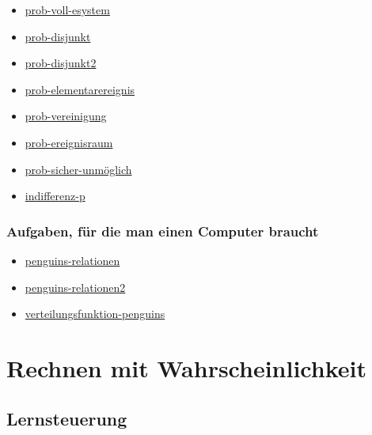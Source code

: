 \documentclass[
  ngerman,
  letterpaper,
  twoside,
  open=any]{scrbook}
\providecommand{\tightlist}{%
  \setlength{\itemsep}{0pt}\setlength{\parskip}{0pt}}\usepackage{longtable,booktabs,array}
\theoremstyle{definition}
\theoremstyle{plain}
\theoremstyle{definition}
\theoremstyle{definition}
\theoremstyle{remark}
\begin{document}
\begin{itemize}
\tightlist
\item
  \href{https://sebastiansauer.github.io/datenwerk/posts/prob-voll-esystem/}{prob-voll-esystem}
\item
  \href{https://sebastiansauer.github.io/datenwerk/posts/prob-disjunkt/}{prob-disjunkt}
\item
  \href{https://sebastiansauer.github.io/datenwerk/posts/prob-disjunkt2/index.html}{prob-disjunkt2}
\item
  \href{https://datenwerk.netlify.app/posts/prob-elementarereignis/index.html}{prob-elementarereignis}
\item
  \href{https://datenwerk.netlify.app/posts/prob-vereinigung/index.html}{prob-vereinigung}
\item
  \href{https://datenwerk.netlify.app/posts/prob-ereignisraum/index.html}{prob-ereignisraum}
\item
  \href{https://datenwerk.netlify.app/posts/prob-sicher-unm\%C3\%B6glich/}{prob-sicher-unmöglich}
\item
  \href{https://datenwerk.netlify.app/posts/indifferenz-p/indifferenz-p.html}{indifferenz-p}
\end{itemize}

\subsection{Aufgaben, für die man einen Computer
braucht}\label{aufgaben-fuxfcr-die-man-einen-computer-braucht-1}

\begin{itemize}
\tightlist
\item
  \href{https://sebastiansauer.github.io/datenwerk/posts/penguins-relationen/}{penguins-relationen}
\item
  \href{https://sebastiansauer.github.io/datenwerk/posts/penguins-relationen2/}{penguins-relationen2}
\item
  \href{https://sebastiansauer.github.io/datenwerk/posts/verteilungsfunktion-penguins/}{verteilungsfunktion-penguins}
\end{itemize}

\chapter{Rechnen mit
Wahrscheinlichkeit}\label{rechnen-mit-wahrscheinlichkeit}

\section{Lernsteuerung}\label{lernsteuerung-3}
\end{document}
